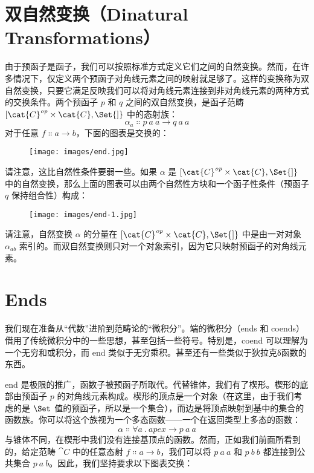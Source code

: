 \section{双自然变换（Dinatural Transformations）}

由于预函子是函子，我们可以按照标准方式定义它们之间的自然变换。然而，在许多情况下，仅定义两个预函子对角线元素之间的映射就足够了。这样的变换称为双自然变换，只要它满足反映我们可以将对角线元素连接到非对角线元素的两种方式的交换条件。两个预函子 $p$ 和 $q$ 之间的双自然变换，是函子范畴 ${[}\cat{C}^\mathit{op}\times{}\cat{C}, \Set{]}$ 中的态射族：
\[\alpha_a \Colon p\ a\ a \to q\ a\ a\]
对于任意 $f \Colon a \to b$，下面的图表是交换的：

\begin{figure}[H]
  \centering
  \texttt{[image: images/end.jpg]}
\end{figure}

\noindent
请注意，这比自然性条件要弱一些。如果 $\alpha$ 是 ${[}\cat{C}^\mathit{op}\times{}\cat{C}, \Set{]}$ 中的自然变换，那么上面的图表可以由两个自然性方块和一个函子性条件（预函子 $q$ 保持组合性）构成：

\begin{figure}[H]
  \centering
  \texttt{[image: images/end-1.jpg]}
\end{figure}

\noindent
请注意，自然变换 $\alpha$ 的分量在 ${[}\cat{C}^\mathit{op}\times{}\cat{C}, \Set{]}$ 中是由一对对象 $\alpha_{a b}$ 索引的。而双自然变换则只对一个对象索引，因为它只映射预函子的对角线元素。

\section{Ends}

我们现在准备从“代数”进阶到范畴论的“微积分”。端的微积分（ends 和 coends）借用了传统微积分中的一些思想，甚至包括一些符号。特别是，coend 可以理解为一个无穷和或积分，而 end 类似于无穷乘积。甚至还有一些类似于狄拉克δ函数的东西。

end 是极限的推广，函数子被预函子所取代。代替锥体，我们有了楔形。楔形的底部由预函子 $p$ 的对角线元素构成。楔形的顶点是一个对象（在这里，由于我们考虑的是 $\Set$ 值的预函子，所以是一个集合），而边是将顶点映射到基中的集合的函数族。你可以将这个族视为一个多态函数——一个在返回类型上多态的函数：
\[\alpha \Colon \forall a\ .\ \mathit{apex} \to p\ a\ a\]
与锥体不同，在楔形中我们没有连接基顶点的函数。然而，正如我们前面所看到的，给定范畴 $\cat{C}$ 中的任意态射 $f \Colon a \to b$，我们可以将 $p\ a\ a$ 和 $p\ b\ b$ 都连接到公共集合 $p\ a\ b$。因此，我们坚持要求以下图表交换：


